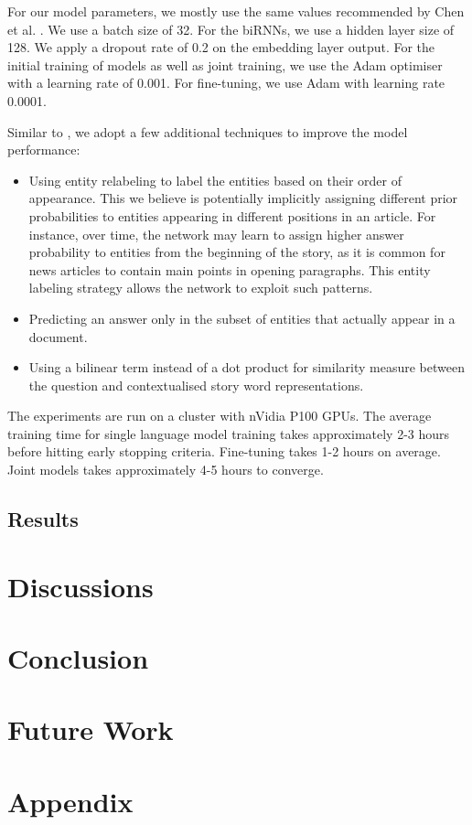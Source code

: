 \documentclass[]{article}
\begin{document}
For our model parameters, we mostly use the same values recommended by Chen et al. \cite{chen2016thorough}. We use a batch size of 32. For the biRNNs, we use a hidden layer size of 128. We apply a dropout rate of 0.2 on the embedding layer output. For the initial training of models as well as joint training, we use the Adam optimiser \cite{kingma2014adam} with a learning rate of 0.001. For fine-tuning, we use Adam with learning rate 0.0001. 

Similar to \cite{chen2016thorough}, we adopt a few additional techniques to improve the model performance: 
\begin{itemize}
	\item Using entity relabeling to label the entities based on their order of appearance. This we believe is potentially implicitly assigning different prior probabilities to entities appearing in different positions in an article. For instance, over time, the network may learn to assign higher answer probability to entities from the beginning of the story, as it is common for news articles to contain main points in opening paragraphs. This entity labeling strategy allows the network to exploit such patterns.
	\item Predicting an answer only in the subset of entities that actually appear in a document.
	\item Using a bilinear term instead of a dot product for similarity measure between the question and contextualised story word representations.
\end{itemize}

The experiments are run on a cluster with nVidia P100 GPUs. The average training time for single language model training takes approximately 2-3 hours before hitting early stopping criteria. Fine-tuning takes 1-2 hours on average. Joint models takes approximately 4-5 hours to converge.

\subsection{Results}



\section{Discussions}



\section{Conclusion}



\section{Future Work}


\newpage




\newpage
\appendix
\section{Appendix}
\end{document}
